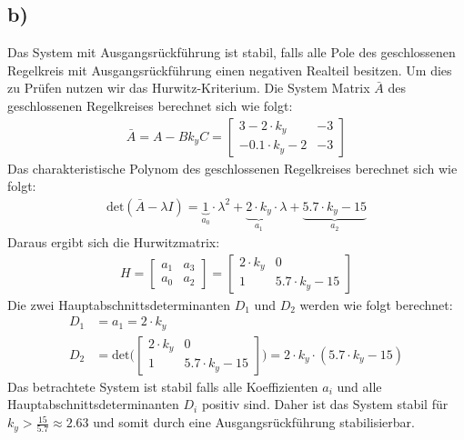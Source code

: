 \documentclass[11pt]{scrartcl} %
\begin{document}
\subsection*{b)}
Das System mit Ausgangsrückführung ist stabil, falls alle Pole des geschlossenen Regelkreis mit Ausgangsrückführung einen negativen Realteil besitzen. Um dies zu Prüfen nutzen wir das Hurwitz-Kriterium. Die System Matrix $\bar{A}$ des geschlossenen Regelkreises berechnet sich wie folgt:
\begin{align*}
	\bar{A}=A-Bk_yC=\begin{bmatrix}3-2\cdot k_y&-3\\-0.1\cdot k_y-2&-3 \end{bmatrix}
\end{align*}
Das charakteristische Polynom des geschlossenen Regelkreises berechnet sich wie folgt:
\begin{align*}
	\text{det}(\bar{A}-\lambda I)=\underbrace{1}_{a_0}\cdot\lambda^2+\underbrace{2\cdot k_y}_{a_1}\cdot\lambda+\underbrace{5.7\cdot k_y-15}_{a_2}
\end{align*}
Daraus ergibt sich die Hurwitzmatrix:
\begin{align*}
	H=\begin{bmatrix}a_1&a_3\\a_0&a_2 \end{bmatrix}=\begin{bmatrix}2\cdot k_y&0\\1&5.7\cdot k_y-15 \end{bmatrix}
\end{align*}
Die zwei Hauptabschnittsdeterminanten $D_1$ und $D_2$ werden wie folgt berechnet:
\begin{align*}
	D_1&=a_1=2\cdot k_y\\
	D_2&=\text{det}\Biggl(\begin{bmatrix}2\cdot k_y&0\\1&5.7\cdot k_y-15 \end{bmatrix}\Biggr)=2\cdot k_y\cdot(5.7\cdot k_y-15)
\end{align*}
Das betrachtete System ist stabil falls alle Koeffizienten $a_i$ und alle Hauptabschnittsdeterminanten $D_i$ positiv sind. Daher ist das System stabil für $k_y>\frac{15}{5.7}\approx2.63$ und somit durch eine Ausgangsrückführung stabilisierbar.
\end{document}
